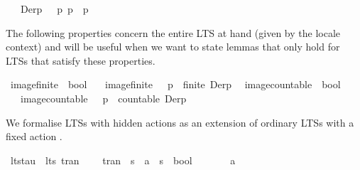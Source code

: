 \begin{isabellebody}
\ \ \ {\isacartoucheopen}Der{\isacharparenleft}{\kern0pt}p{\isacharcomma}{\kern0pt}\ {\isasymalpha}{\isacharparenright}{\kern0pt}\ {\isasymequiv}\ {\isacharbraceleft}{\kern0pt}p{\isacharprime}{\kern0pt}{\isachardot}{\kern0pt}\ p\ {\isasymlongmapsto}{\isasymalpha}\ p{\isacharprime}{\kern0pt}{\isacharbraceright}{\kern0pt}{\isacartoucheclose}%
\begin{isamarkuptext}%
The following properties concern the entire LTS at hand (given by the locale context) and will be useful when we want to state lemmas that only hold for LTSs that satisfy these properties.%
\end{isamarkuptext}\isamarkuptrue%
\isamarkupfalse%
\ image{\isacharunderscore}{\kern0pt}finite\ {\isacharcolon}{\kern0pt}{\isacharcolon}{\kern0pt}\ {\isacartoucheopen}bool{\isacartoucheclose}\isanewline
\ \ \ {\isacartoucheopen}image{\isacharunderscore}{\kern0pt}finite\ {\isasymequiv}\ {\isacharparenleft}{\kern0pt}{\isasymforall}\ p\ {\isasymalpha}{\isachardot}{\kern0pt}\ finite\ Der{\isacharparenleft}{\kern0pt}p{\isacharcomma}{\kern0pt}\ {\isasymalpha}{\isacharparenright}{\kern0pt}{\isacharparenright}{\kern0pt}{\isacartoucheclose}\isanewline
\isanewline
{}\isamarkupfalse%
\ image{\isacharunderscore}{\kern0pt}countable\ {\isacharcolon}{\kern0pt}{\isacharcolon}{\kern0pt}\ {\isacartoucheopen}bool{\isacartoucheclose}\isanewline
\ \ \ {\isacartoucheopen}image{\isacharunderscore}{\kern0pt}countable\ {\isasymequiv}\ {\isacharparenleft}{\kern0pt}{\isasymforall}\ p\ {\isasymalpha}{\isachardot}{\kern0pt}\ countable\ Der{\isacharparenleft}{\kern0pt}p{\isacharcomma}{\kern0pt}\ {\isasymalpha}{\isacharparenright}{\kern0pt}{\isacharparenright}{\kern0pt}{\isacartoucheclose}\isanewline
\isanewline
{}\isamarkupfalse%
\ %
%
\begin{isamarkuptext}%
We formalise LTSs with hidden actions as an extension of ordinary LTSs with a fixed action \isa{{\isasymtau}}.%
\end{isamarkuptext}\isamarkuptrue%
\isamarkupfalse%
\ lts{\isacharunderscore}{\kern0pt}tau\ {\isacharequal}{\kern0pt}\ lts\ tran\ \isanewline
\ \ \ tran\ {\isacharcolon}{\kern0pt}{\isacharcolon}{\kern0pt}\ {\isacartoucheopen}{\isacharprime}{\kern0pt}s\ {\isasymRightarrow}\ {\isacharprime}{\kern0pt}a\ {\isasymRightarrow}\ {\isacharprime}{\kern0pt}s\ {\isasymRightarrow}\ bool{\isacartoucheclose}\ {\isacharplus}{\kern0pt}\ \isanewline
\ \ \ {\isasymtau}\ {\isacharcolon}{\kern0pt}{\isacharcolon}{\kern0pt}\ {\isacartoucheopen}{\isacharprime}{\kern0pt}a{\isacartoucheclose}\isanewline
%
\isadelimtheory
%
\endisadelimtheory
%
\isatagtheory
%
\endisatagtheory
{\isafoldtheory}%
%
\isadelimtheory
%
\endisadelimtheory
%
\end{isabellebody}%
